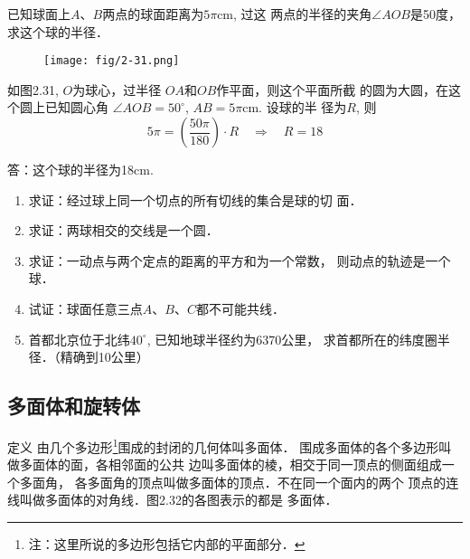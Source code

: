 \begin{example}
    已知球面上$A$、$B$两点的球面距离为$5\pi$cm, 过这
两点的半径的夹角$\angle AOB$是50度，求这个球的半径．
\end{example}

\begin{figure}[htp]
    \centering
\texttt{[image: fig/2-31.png]}
    \caption{}
\end{figure}


\begin{solution}
    如图2.31, $O$为球心，过半径
$OA$和$OB$作平面，则这个平面所截
的圆为大圆，在这个圆上已知圆心角
$\angle AOB=50^{\circ}$, $AB=5\pi$cm. 设球的半
径为$R$, 则
\[5\pi=\left(\frac{50\pi}{180}\right)\cdot R\quad \Rightarrow\quad R=18\]

答：这个球的半径为18cm.
\end{solution}

\begin{ex}
\begin{enumerate}
    \item 求证：经过球上同一个切点的所有切线的集合是球的切
    面．
    \item 求证：两球相交的交线是一个圆．
    \item 求证：一动点与两个定点的距离的平方和为一个常数，
    则动点的轨迹是一个球．
    \item 试证：球面任意三点$A$、$B$、$C$都不可能共线．
    \item 
    首都北京位于北纬$40^{\circ}$, 已知地球半径约为6370公里，
    求首都所在的纬度圈半径．（精确到10公里）
\end{enumerate}
\end{ex}

\subsection{多面体和旋转体}
\begin{blk}
{定义} 由几个多边形\footnote{注：这里所说的多边形包括它内部的平面部分．}围成的封闭的几何体叫多面体．
围成多面体的各个多边形叫做多面体的面，各相邻面的公共
边叫多面体的棱，相交于同一顶点的侧面组成一个多面角，
各多面角的顶点叫做多面体的顶点．不在同一个面内的两个
顶点的连线叫做多面体的对角线．图2.32的各图表示的都是
多面体．    
\end{blk}

